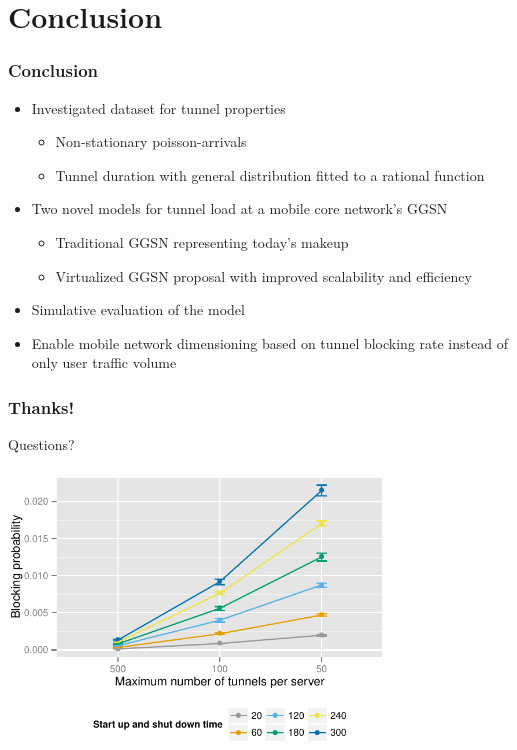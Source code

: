 \documentclass{beamer}
\begin{document}
\section{Conclusion}

\begin{frame}
	\frametitle{Conclusion}

	\begin{itemize}
		\item Investigated dataset for tunnel properties

		\begin{itemize}
			\item Non-stationary poisson-arrivals
			\item Tunnel duration with general distribution fitted to a rational function
		\end{itemize}

		\item Two novel models for tunnel load at a mobile core network's GGSN
		\begin{itemize}
			\item Traditional GGSN representing today's makeup
			\item Virtualized GGSN proposal with improved scalability and efficiency
		\end{itemize}

		\item Simulative evaluation of the model

		\item Enable mobile network dimensioning based on tunnel blocking rate instead of only user traffic volume


	\end{itemize}

\end{frame}


\begin{frame}
	\frametitle{Thanks!}

	\centering
		\Large Questions?
\end{frame}


\begin{frame}
\end{frame}


\begin{frame}
	\frametitle{}
	\begin{center}
		\includegraphics[height=7cm]{figures/compare-maxinstances-block.pdf}
	\end{center}
\end{frame}
\end{document}
